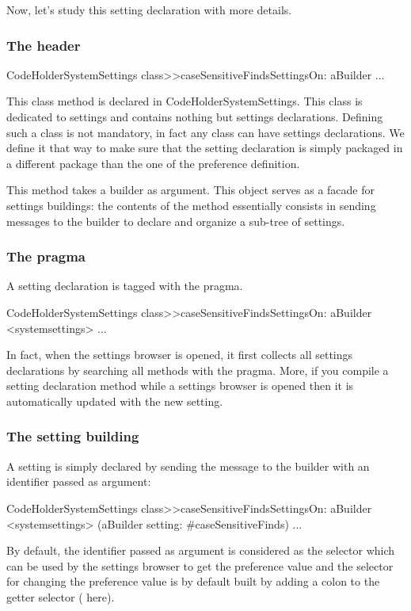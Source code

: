 \documentclass[a4paper,10pt,twoside]{book}
\begin{document}
Now, let's study this setting declaration with more details. 

\subsubsection{The header}
\begin{code}{}
CodeHolderSystemSettings class>>caseSensitiveFindsSettingsOn: aBuilder
...
\end{code}
This class method is declared in CodeHolderSystemSettings. This class is dedicated to settings and contains nothing but settings declarations. Defining such a class is not mandatory, in fact any class can have settings declarations. We define it that way to make sure that the setting declaration is simply packaged in a different package than the one of the preference definition.

This method takes a builder as argument. This object serves as a facade for settings buildings: the contents of the method essentially consists in sending messages to the builder to declare and organize a sub-tree of settings.

\subsubsection{The pragma}
A setting declaration is tagged with the  pragma.
\begin{code}{}
CodeHolderSystemSettings class>>caseSensitiveFindsSettingsOn: aBuilder
	<systemsettings>
...
\end{code}
In fact, when the settings browser is opened, it first collects all settings declarations by searching all methods with the  pragma. More, if you compile a setting declaration method while a settings browser is opened then it is automatically updated with the new setting. 

\subsubsection{The setting building}
A setting is simply declared by sending the message  to the builder with an identifier passed as argument:
\begin{code}{}
CodeHolderSystemSettings class>>caseSensitiveFindsSettingsOn: aBuilder
	<systemsettings>
	(aBuilder setting: #caseSensitiveFinds) 
...
\end{code}
By default, the identifier passed as argument is considered as the selector which can be used by the settings browser to get the preference value and the selector for changing the preference value is by default built by adding a colon to the getter selector (\ie {} here).
\end{document}
